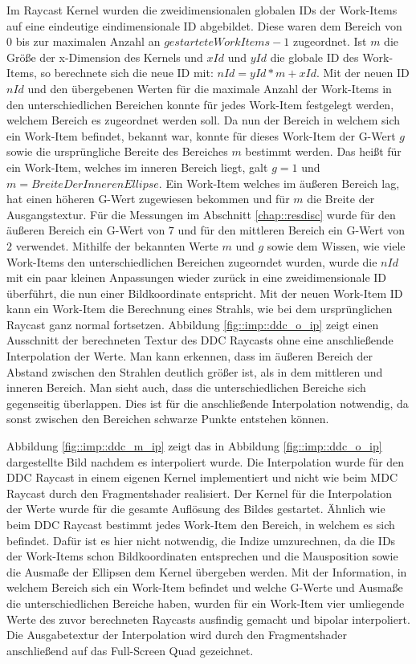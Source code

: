 Im Raycast Kernel wurden die zweidimensionalen globalen IDs der Work-Items auf eine eindeutige eindimensionale ID abgebildet.
Diese waren dem Bereich von $0$ bis zur maximalen Anzahl an $gestarteteWorkItems-1$ zugeordnet.
Ist $m$ die Größe der x-Dimension des Kernels und $xId$ und $yId$ die globale ID des Work-Items, so berechnete sich die neue ID mit: $nId = yId * m + xId$.
Mit der neuen ID $nId$ und den übergebenen Werten für die maximale Anzahl der Work-Items in den unterschiedlichen Bereichen konnte für jedes Work-Item festgelegt werden, welchem Bereich es zugeordnet werden soll.
Da nun der Bereich in welchem sich ein Work-Item befindet, bekannt war, konnte für dieses Work-Item der G-Wert $g$ sowie die ursprüngliche Bereite des Bereiches $m$ bestimmt werden.
Das heißt für ein Work-Item, welches im inneren Bereich liegt, galt $g=1$ und $m=BreiteDerInnerenEllipse$.
Ein Work-Item welches im äußeren Bereich lag, hat einen höheren G-Wert zugewiesen bekommen und für $m$ die Breite der Ausgangstextur.
Für die Messungen im Abschnitt \ref{chap::resdisc} wurde für den äußeren Bereich ein G-Wert von $7$ und für den mittleren Bereich ein G-Wert von $2$ verwendet.
Mithilfe der bekannten Werte $m$ und $g$ sowie dem Wissen, wie viele Work-Items den unterschiedlichen Bereichen zugeorndet wurden, wurde die $nId$ mit ein paar kleinen Anpassungen wieder zurück in eine zweidimensionale ID überführt, die nun einer Bildkoordinate entspricht.
Mit der neuen Work-Item ID kann ein Work-Item die Berechnung eines Strahls, wie bei dem ursprünglichen Raycast ganz normal fortsetzen.
Abbildung \ref{fig::imp::ddc_o_ip} zeigt einen Ausschnitt der berechneten Textur des DDC Raycasts ohne eine anschließende Interpolation der Werte.
Man kann erkennen, dass im äußeren Bereich der Abstand zwischen den Strahlen deutlich größer ist, als in dem mittleren und inneren Bereich.
Man sieht auch, dass die unterschiedlichen Bereiche sich gegenseitig überlappen.
Dies ist für die anschließende Interpolation notwendig, da sonst zwischen den Bereichen schwarze Punkte entstehen können.

Abbildung \ref{fig::imp::ddc_m_ip} zeigt das in Abbildung \ref{fig::imp::ddc_o_ip} dargestellte Bild nachdem es interpoliert wurde.
Die Interpolation wurde für den DDC Raycast in einem eigenen Kernel implementiert und nicht wie beim MDC Raycast durch den Fragmentshader realisiert.
Der Kernel für die Interpolation der Werte wurde für die gesamte Auflösung des Bildes gestartet.
Ähnlich wie beim DDC Raycast bestimmt jedes Work-Item den Bereich, in welchem es sich befindet.
Dafür ist es hier nicht notwendig, die Indize umzurechnen, da die IDs der Work-Items schon Bildkoordinaten entsprechen und die Mausposition sowie die Ausmaße der Ellipsen dem Kernel übergeben werden.
Mit der Information, in welchem Bereich sich ein Work-Item befindet und welche G-Werte und Ausmaße die unterschiedlichen Bereiche haben, wurden für ein Work-Item vier umliegende Werte des zuvor berechneten Raycasts ausfindig gemacht und bipolar interpoliert.
Die Ausgabetextur der Interpolation wird durch den Fragmentshader anschließend auf das Full-Screen Quad gezeichnet.

